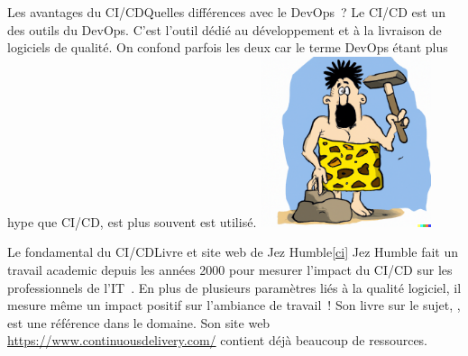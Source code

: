 \documentclass{beamer}
\begin{document}
    \begin{frame}{Les avantages du CI/CD}{Quelles différences avec le DevOps~?}
        \transdissolve
        Le CI/CD est un des outils du DevOps.
        \bigbreak
        C'est l'outil dédié au développement et à la livraison de logiciels de qualité.
        On confond parfois les deux car le terme DevOps étant plus hype que CI/CD, est plus souvent est utilisé.
        \bigbreak
        \centering
        \includegraphics[width=5cm]{image/caveman-using-a-sophisticated-tool}
    \end{frame}

    \begin{frame}{Le fondamental du CI/CD}{Livre et site web de Jez Humble\cref{ci}}
        \transdissolve
        Jez Humble fait un travail academic depuis les années 2000 pour mesurer l'impact du CI/CD sur les professionnels de l'IT~.
        \bigbreak
        En plus de plusieurs paramètres liés à la qualité logiciel, il mesure même un impact positif sur l'ambiance de travail~!
        \bigbreak
        Son livre sur le sujet, , est une référence dans le domaine.
        Son site web \url{https://www.continuousdelivery.com/} contient déjà beaucoup de ressources.
    \end{frame}
\end{document}
